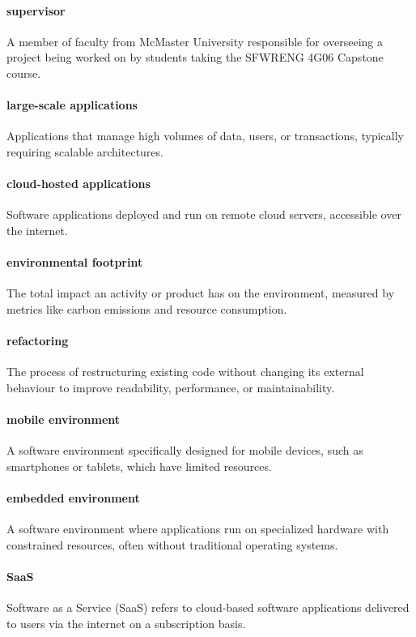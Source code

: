 \documentclass[12pt]{article}
\begin{document}
\paragraph*{supervisor}
A member of faculty from McMaster University responsible for
overseeing a project being worked on by students taking the SFWRENG
4G06 Capstone course.

\paragraph*{large-scale applications}
Applications that manage high volumes of data, users, or
transactions, typically requiring scalable architectures.

\paragraph*{cloud-hosted applications}
Software applications deployed and run on remote cloud servers,
accessible over the internet.

\paragraph*{environmental footprint}
The total impact an activity or product has on the environment,
measured by metrics like carbon emissions and resource consumption.

\paragraph*{refactoring}
The process of restructuring existing code without changing its
external behaviour to improve readability, performance, or maintainability.

\paragraph*{mobile environment}
A software environment specifically designed for mobile devices, such
as smartphones or tablets, which have limited resources.

\paragraph*{embedded environment}
A software environment where applications run on specialized hardware
with constrained resources, often without traditional operating systems.

\paragraph*{SaaS}
Software as a Service (SaaS) refers to cloud-based software
applications delivered to users via the internet on a subscription basis.
\end{document}
